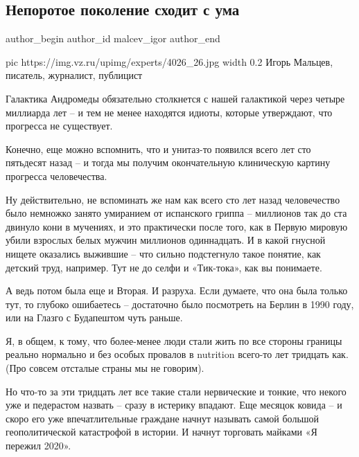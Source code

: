 
 
 
 
 
 
\subsection{Непоротое поколение сходит с ума}
\label{sec:10_12_2020.news.ru.vz.malcev_igor.1.neporotoje_pokolenie}
\ifcmt
	author_begin
   author_id malcev_igor
	author_end
\fi

\ifcmt
pic https://img.vz.ru/upimg/experts/4026_26.jpg
width 0.2
\fi
Игорь Мальцев, писатель, журналист, публицист

Галактика Андромеды обязательно столкнется с нашей галактикой через четыре
миллиарда лет – и тем не менее находятся идиоты, которые утверждают, что
прогресса не существует.

Конечно, еще можно вспомнить, что и унитаз-то появился всего лет сто пятьдесят
назад – и тогда мы получим окончательную клиническую картину прогресса
человечества.

Ну действительно, не вспоминать же нам как всего сто лет назад человечество
было немножко занято умиранием от испанского гриппа – миллионов так до ста
двинуло кони в мучениях, и это практически после того, как в Первую мировую
убили взрослых белых мужчин миллионов одиннадцать. И в какой гнусной нищете
оказались выжившие – что сильно подстегнуло такое понятие, как детский труд,
например. Тут не до селфи и «Тик-тока», как вы понимаете. 

А ведь потом была еще и Вторая. И разруха. Если думаете, что она была только
тут, то глубоко ошибаетесь – достаточно было посмотреть на Берлин в 1990 году,
или на Глазго с Будапештом чуть раньше.

Я, в общем, к тому, что более-менее люди стали жить по все стороны границы
реально нормально и без особых провалов в nutrition всего-то лет тридцать как.
(Про совсем отсталые страны мы не говорим). 

Но что-то за эти тридцать лет все такие стали нервические и тонкие, что некого
уже и педерастом назвать – сразу в истерику впадают. Еще месяцок ковида – и
скоро его уже впечатлительные граждане начнут называть самой большой
геополитической катастрофой в истории. И начнут торговать майками «Я пережил
2020».

